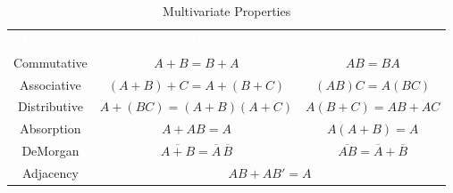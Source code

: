 \begin{table}[ht]
	\caption{Multivariate Properties}
	\label{ap:tab:multivariate_properties}
	\sffamily
	\newcommand{\head}[1]{\textcolor{white}{\textbf{#1}}}		
	\begin{center}
		\begin{tabular}{ccc} 
			\rowcolor{black!75}
			{\head{Property}} & \head{OR} & \head{AND} \\
			Commutative & $ A + B = B + A $ & $ AB = BA $ \\
			Associative & $ (A + B) + C = A + (B + C) $ & $ (AB)C = A(BC) $ \\
			Distributive & $ A + (BC) = (A+B)(A+C) $ & $ A(B+C) = AB + AC $ \\
			Absorption & $ A + AB = A $ & $ A(A+B) = A $ \\
			DeMorgan & $ \overline{A+B}=\overline{A}\,\overline{B} $ 
				& $ \overline{AB}=\overline{A}+\overline{B} $ \\
			Adjacency & \multicolumn{2}{c}{$ AB + AB' = A $} 
		\end{tabular}
	\end{center}
\end{table}

